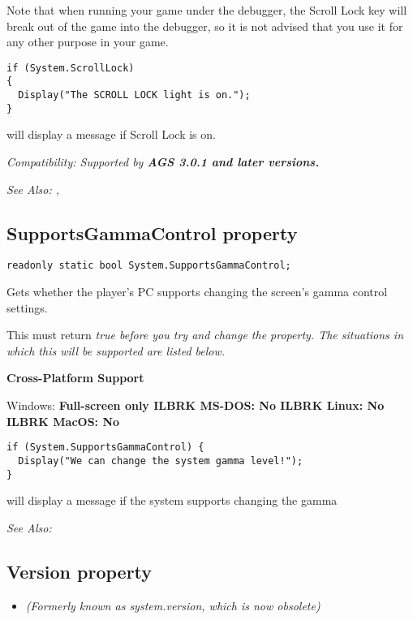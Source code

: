 Note that when running your game under the debugger, the Scroll Lock key will break
out of the game into the debugger, so it is not advised that you use it for any
other purpose in your game.

\begin{verbatim}
if (System.ScrollLock)
{
  Display("The SCROLL LOCK light is on.");
}
\end{verbatim}
will display a message if Scroll Lock is on.

\it{Compatibility:} Supported by \bf{AGS 3.0.1} and later versions.

\it{See Also:} ,


\subsection{SupportsGammaControl property}\label{System.SupportsGammaControl}%

\begin{verbatim}
readonly static bool System.SupportsGammaControl;
\end{verbatim}
Gets whether the player's PC supports changing the screen's gamma control settings.

This must return \it{true} before you try and change the  property.
The situations in which this will be supported are listed below.

\bf{Cross-Platform Support}

Windows: \bf{ Full-screen only }ILBRK
MS-DOS: \bf{ No }ILBRK
Linux: \bf{ No }ILBRK
MacOS: \bf{ No }

\begin{verbatim}
if (System.SupportsGammaControl) {
  Display("We can change the system gamma level!");
}
\end{verbatim}
will display a message if the system supports changing the gamma

\it{See Also:} 


\subsection{Version property}\label{System.Version}%

\begin{itemize}
\item \it{(Formerly known as system.version, which is now obsolete)}
\end{itemize}

